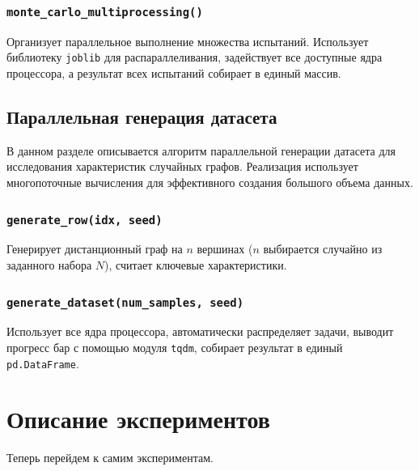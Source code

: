 \documentclass[12pt,a4paper]{report}
\begin{document}
\subsection{\texttt{monte\_carlo\_multiprocessing()}}
Организует параллельное выполнение множества испытаний. Использует библиотеку \texttt{joblib} для распараллеливания, задействует все доступные ядра процессора, а результат всех испытаний собирает в единый массив.
\section{Параллельная генерация датасета}
В данном разделе описывается алгоритм параллельной генерации датасета для исследования характеристик случайных графов. Реализация использует многопоточные вычисления для эффективного создания большого объема данных.
\subsection{\texttt{generate\_row(idx, seed)}}
Генерирует дистанционный граф на $n$ вершинах ($n$ выбирается случайно из заданного набора $N$), считает ключевые характеристики.
\subsection{\texttt{generate\_dataset(num\_samples, seed)}}
Использует все ядра процессора, автоматически распределяет задачи, выводит прогресс бар с помощью модуля \texttt{tqdm}, собирает результат в единый \texttt{pd.DataFrame}.

\chapter{Описание экспериментов}
Теперь перейдем к самим экспериментам.
\end{document}

